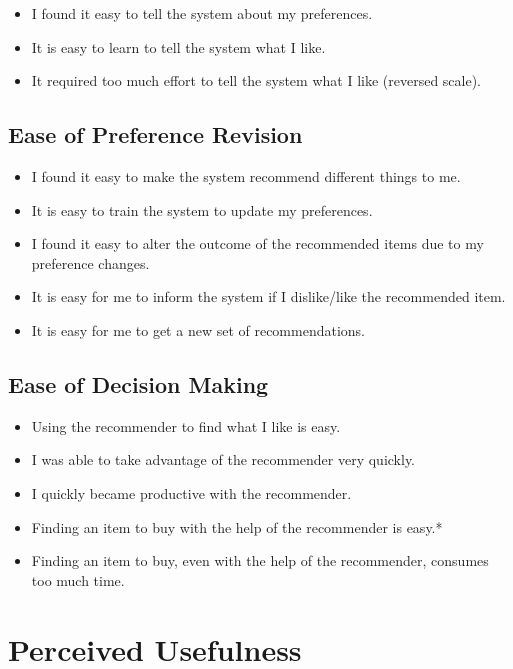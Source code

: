\begin{itemize}
\item I found it easy to tell the system about my preferences.
\item It is easy to learn to tell the system what I like.
\item It required too much effort to tell the system what I like (reversed scale).
\end{itemize}

\subsection{Ease of Preference Revision}

\begin{itemize}
\item I found it easy to make the system recommend different things to me.
\item It is easy to train the system to update my preferences.
\item I found it easy to alter the outcome of the recommended items due to my preference changes.
\item It is easy for me to inform the system if I dislike/like the recommended item.
\item It is easy for me to get a new set of recommendations.
\end{itemize}

\subsection{Ease of Decision Making}

\begin{itemize}
\item Using the recommender to find what I like is easy.
\item I was able to take advantage of the recommender very quickly.
\item I quickly became productive with the recommender.
\item Finding an item to buy with the help of the recommender is easy.*
\item Finding an item to buy, even with the help of the recommender, consumes too much time.
\end{itemize}

\section{Perceived Usefulness}


